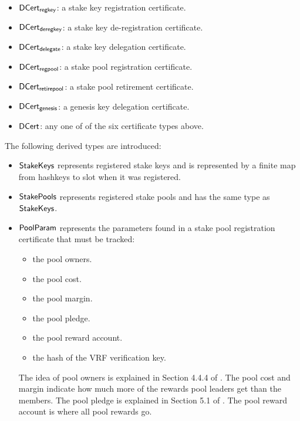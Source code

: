 \begin{itemize}
\item $\mathsf{DCert_{regkey}}$: a stake key registration certificate.
\item $\mathsf{DCert_{deregkey}}$: a stake key de-registration certificate.
\item $\mathsf{DCert_{delegate}}$: a stake key delegation certificate.
\item $\mathsf{DCert_{regpool}}$: a stake pool registration certificate.
\item $\mathsf{DCert_{retirepool}}$: a stake pool retirement certificate.
\item $\mathsf{DCert_{genesis}}$: a genesis key delegation certificate.
\item $\mathsf{DCert}$: any one of of the six certificate types above.
\end{itemize}
The following derived types are introduced:
\begin{itemize}
  \item $\mathsf{StakeKeys}$ represents registered stake keys and is represented by a finite
    map from hashkeys to slot when it was registered.
  \item$\mathsf{StakePools}$ represents registered stake pools and has the same type as
    $\mathsf{StakeKeys}$.
\item $\mathsf{PoolParam}$ represents the parameters found in a stake pool registration certificate
  that must be tracked:
  \begin{itemize}
    \item the pool owners.
    \item the pool cost.
    \item the pool margin.
    \item the pool pledge.
    \item the pool reward account.
    \item the hash of the VRF verification key.
  \end{itemize}
  The idea of pool owners is explained in Section 4.4.4 of \cite{delegation_design}.
  The pool cost and margin indicate how much more of the rewards pool leaders
  get than the members.
  The pool pledge is explained in Section 5.1 of \cite{delegation_design}.
  The pool reward account is where all pool rewards go.
\end{itemize}

